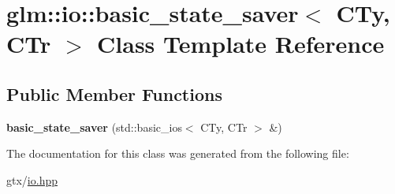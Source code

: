 \hypertarget{classglm_1_1io_1_1basic__state__saver}{\section{glm\-:\-:io\-:\-:basic\-\_\-state\-\_\-saver$<$ C\-Ty, C\-Tr $>$ Class Template Reference}
\label{classglm_1_1io_1_1basic__state__saver}
}
\subsection*{Public Member Functions}
\begin{DoxyCompactItemize}
\item 
\hypertarget{classglm_1_1io_1_1basic__state__saver_af3b2ff62d326632d244bcce4df3a45b4}{{\bfseries basic\-\_\-state\-\_\-saver} (std\-::basic\-\_\-ios$<$ C\-Ty, C\-Tr $>$ \&)}\label{classglm_1_1io_1_1basic__state__saver_af3b2ff62d326632d244bcce4df3a45b4}

\end{DoxyCompactItemize}


The documentation for this class was generated from the following file\-:\begin{DoxyCompactItemize}
\item 
gtx/\hyperlink{io_8hpp}{io.\-hpp}\end{DoxyCompactItemize}
